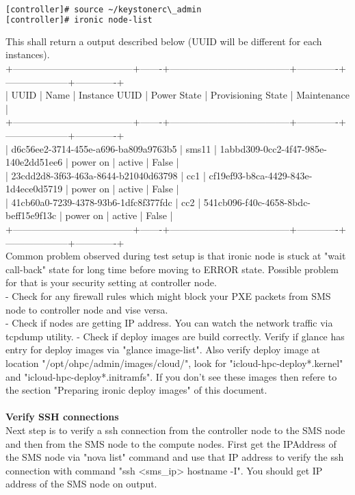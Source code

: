 \begin{lstlisting}[language=bash,keywords={},upquote=true]
[controller]# source ~/keystonerc\_admin
[controller]# ironic node-list
\end{lstlisting}
This shall return a output described below (UUID will be different for each instances).\\
+--------------------------------------+-------+--------------------------------------+-------------+--------------------+-------------+\\
| UUID                                 | Name  | Instance UUID                        | Power State | Provisioning State | Maintenance |\\
+--------------------------------------+-------+--------------------------------------+-------------+--------------------+-------------+\\
| d6c56ee2-3714-455e-a696-ba809a9763b5 | sms11 | 1abbd309-0cc2-4f47-985e-140e2dd51ee6 | power on    | active             | False       |\\
| 23cdd2d8-3f63-463a-8644-b21040d63798 | cc1   | cf19ef93-b8ca-4429-843e-1d4ece0d5719 | power on    | active             | False       |\\
| 41cb60a0-7239-4378-93b6-1dfc8f377fdc | cc2   | 541cb096-f40c-4658-8bdc-beff15e9f13c | power on    | active             | False       |\\
+--------------------------------------+-------+--------------------------------------+-------------+--------------------+-------------+\\

Common problem observed during test setup is that ironic node is stuck at "wait call-back" state for long time before moving to ERROR state. Possible problem for that is your security setting at controller node. \\
- Check for any firewall rules which might block your PXE packets from SMS node to controller node and vise versa. \\
- Check if nodes are getting IP address. You can watch the network traffic via tcpdump utility.
- Check if deploy images are build correctly. Verify if glance has entry for deploy images via "glance image-list". Also verify deploy image at location "/opt/ohpc/admin/images/cloud/", look for "icloud-hpc-deploy*.kernel" and "icloud-hpc-deploy*.initramfs". If you don't see these images then refere to the section "Preparing ironic deploy images" of this document. \\
\\
\textbf{Verify SSH connections}\\
Next step is to verify a ssh connection from the controller node to the SMS node and then from the SMS node to the compute nodes. First get the IPAddress of the SMS node via "nova list" command and use that IP address to verify the ssh connection with command "ssh <sms\_ip> hostname -I". You should get IP address of the SMS node on output. 
 
